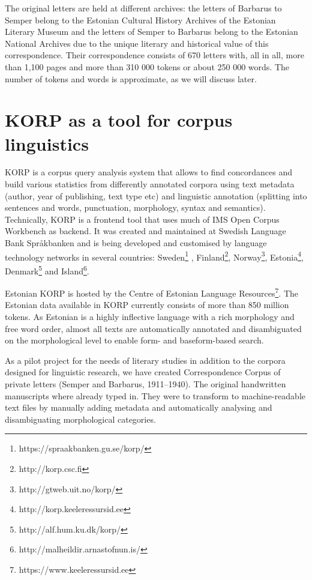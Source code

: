 \documentclass[runningheads]{llncs}
\begin{document}
The original letters are held at different archives: the letters of Barbarus to Semper belong to the Estonian Cultural History Archives of the Estonian Literary Museum and the letters of Semper to Barbarus belong to the Estonian National Archives due to the unique literary and historical value of this correspondence. Their correspondence consists of 670 letters with, all in all, more than 1,100 pages and more than 310 000 tokens or about 250 000 words.  The number of tokens and words is approximate, as we will discuss later. 


\section{KORP as a tool for corpus linguistics}

KORP is a corpus query analysis system that allows to find concordances and build various statistics from differently annotated corpora using text metadata (author, year of publishing, text type etc) and linguistic annotation (splitting into sentences and words, punctuation, morphology, syntax and semantics). Technically, KORP is a frontend tool that uses much of IMS Open Corpus Workbench \cite{Hardie:2012:1384-6655:380} as backend. It was created and maintained at Swedish Language Bank Spr{\aa}kbanken \cite{BORIN12.248} and is being developed and customised by language technology networks in several countries: Sweden\footnote{ https://spraakbanken.gu.se/korp/}
, Finland\footnote{http://korp.csc.fi}, Norway\footnote{http://gtweb.uit.no/korp/}, Estonia\footnote{http://korp.keeleressursid.ee}, Denmark\footnote{http://alf.hum.ku.dk/korp/} and Island\footnote{http://malheildir.arnastofnun.is/}. 

Estonian KORP is hosted by the Centre of Estonian Language Resources\footnote{https://www.keeleressursid.ee}. The Estonian data available in KORP currently consists of more than 850 million tokens. As Estonian is a highly inflective language with a rich morphology and free word order, almost all texts are automatically annotated and disambiguated on the morphological level to enable form- and baseform-based search.


As a pilot project for the needs of literary studies in addition to the corpora designed for linguistic research, we have created Correspondence Corpus of private letters (Semper and Barbarus, 1911--1940). The original handwritten manuscripts where already typed in. They were to transform to machine-readable text files by manually adding metadata and automatically analysing and disambiguating morphological categories. 
\end{document}
